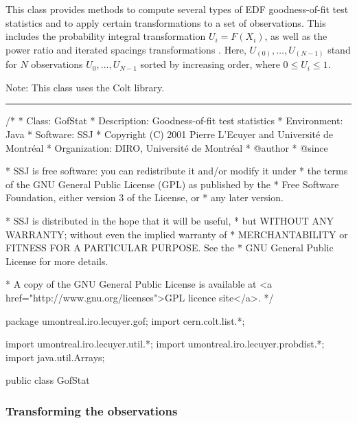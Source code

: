 
This class provides methods to compute several types of EDF goodness-of-fit
test statistics and to apply certain transformations to a set of
observations.  This includes the probability integral transformation
$U_i = F(X_i)$, as well as the power ratio and iterated spacings
transformations \cite{tSTE86a}. Here, $U_{(0)}, \dots, U_{(N-1)}$ stand
for $N$ observations $U_0,\dots,U_{N-1}$ sorted by increasing order, where
$0\le U_i\le 1$.

Note: This class uses the Colt library.

\bigskip\hrule

\begin{code}
\begin{hide}
/*
 * Class:        GofStat
 * Description:  Goodness-of-fit test statistics
 * Environment:  Java
 * Software:     SSJ
 * Copyright (C) 2001  Pierre L'Ecuyer and Université de Montréal
 * Organization: DIRO, Université de Montréal
 * @author
 * @since

 * SSJ is free software: you can redistribute it and/or modify it under
 * the terms of the GNU General Public License (GPL) as published by the
 * Free Software Foundation, either version 3 of the License, or
 * any later version.

 * SSJ is distributed in the hope that it will be useful,
 * but WITHOUT ANY WARRANTY; without even the implied warranty of
 * MERCHANTABILITY or FITNESS FOR A PARTICULAR PURPOSE.  See the
 * GNU General Public License for more details.

 * A copy of the GNU General Public License is available at
   <a href="http://www.gnu.org/licenses">GPL licence site</a>.
 */
\end{hide}
package umontreal.iro.lecuyer.gof;
   import cern.colt.list.*;
\begin{hide}
import umontreal.iro.lecuyer.util.*;
import umontreal.iro.lecuyer.probdist.*;
import java.util.Arrays;\end{hide}

public class GofStat\begin{hide} {
   private GofStat() {}
\end{hide}
\end{code}

\subsubsection*{Transforming the observations}

